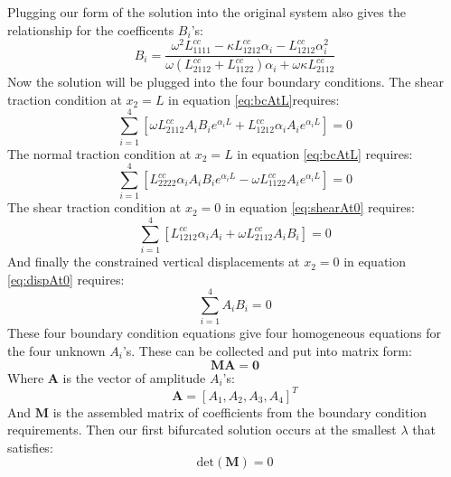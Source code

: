 \documentclass[11pt]{article}
\begin{document}
Plugging our form of the solution into the original system also gives the relationship for the coefficents $B_i$'s:
\begin{equation}
B_i = \frac {\omega^2 L^{cc}_{1111} - \kappa L^{cc}_{1212} \alpha_i - L^{cc}_{1212} \alpha_i^2 }
            {\omega \left (L^{cc}_{2112} + L^{cc}_{1122} \right) \alpha_i + \omega \kappa L^{cc}_{2112}}
\end{equation}
Now the solution will be plugged into the four boundary conditions. The shear traction condition at $x_2 = L$ in equation \ref{eq:bcAtL}requires:
\begin{equation}
\sum_{i = 1}^4 \left[ \omega L^{cc}_{2112} A_iB_i e^{\alpha_iL} + L^{cc}_{1212} \alpha_i A_i e^{\alpha_i L} \right ] = 0
\end{equation}
The normal traction condition at $x_2 = L$ in equation \ref{eq:bcAtL} requires:
\begin{equation}
\sum_{i = 1}^4 \left [ L^{cc}_{2222} \alpha_i A_i B_i e^{\alpha_i L} - \omega L^{cc}_{1122} A_i e^{\alpha_i L} \right ] = 0  
\end{equation}
The shear traction condition at $x_2 = 0$ in equation \ref{eq:shearAt0} requires:
\begin{equation}
\sum_{i = 1}^4 \left [ L^{cc}_{1212} \alpha_iA_i + \omega L^{cc}_{2112} A_i B_i \right ] = 0
\end{equation}
And finally the constrained vertical displacements at $x_2 = 0$ in equation \ref{eq:dispAt0} requires:
\begin{equation}
\sum_{i=1}^4 A_i B_i = 0
\end{equation}
These four boundary condition equations give four homogeneous equations for the four unknown $A_i$'s. These can be collected and put into matrix form:
\begin{equation}
\mathbf{M} \mathbf{A} = \mathbf{0} 
\end{equation}
Where $\mathbf{A}$ is the vector of amplitude $A_i$'s:
\begin{equation}
\mathbf{A} = [ A_1, A_2, A_3, A_4 ]^T
\end{equation}
And $\mathbf{M}$ is the assembled matrix of coefficients from the boundary condition requirements. Then our first bifurcated solution occurs at the smallest $\lambda$ that satisfies:
\begin{equation}
\mathrm{det}(\mathbf{M}) = 0
\end{equation}
\end{document}
